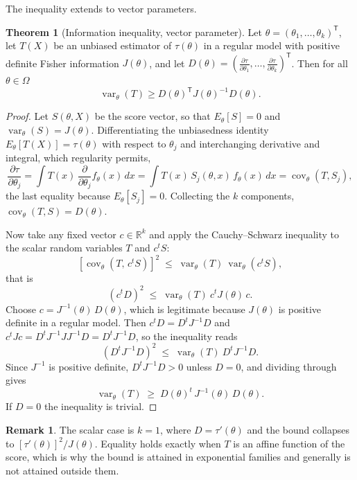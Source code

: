 \documentclass[12pt,a4paper]{report}
\theoremstyle{definition}
\newtheorem{thm}{Theorem}[section]
\newtheorem*{remark}{Remark}
\DeclareMathOperator{\var}{var}
\DeclareMathOperator{\cov}{cov}
\begin{document}
The inequality extends to vector parameters.

\begin{thm}[Information inequality, vector parameter]
\label{thm:crlbvector}
Let $\theta = (\theta_1, \dots, \theta_k)^{\mathsf T}$, let $T(X)$ be an unbiased
estimator of $\tau(\theta)$ in a regular model with positive definite Fisher
information $J(\theta)$, and let
$D(\theta) = \left(\frac{\partial\tau}{\partial\theta_1}, \dots, \frac{\partial\tau}{\partial\theta_k}\right)^{\mathsf T}$.
Then for all $\theta\in\Omega$
\[\var_\theta(T)\ge D(\theta)^{\mathsf T}J(\theta)^{-1}D(\theta) .\]
\end{thm}

\begin{proof}
Let $S(\theta,X)$ be the score vector, so that $E_{\theta}\left[S\right]=0$ and
$\var_{\theta}(S)=J(\theta)$. Differentiating the unbiasedness identity
$E_{\theta}\left[T(X)\right]=\tau(\theta)$ with respect to $\theta_j$ and
interchanging derivative and integral, which regularity permits,
\[\frac{\partial \tau}{\partial\theta_j}
= \int T(x)\,\frac{\partial}{\partial\theta_j} f_{\theta}(x)\,dx
= \int T(x)\, S_j(\theta,x)\, f_{\theta}(x)\,dx
= \cov_{\theta}\!\left(T, S_j\right),\]
the last equality because $E_{\theta}\left[S_j\right]=0$. Collecting the $k$
components, $\cov_{\theta}(T,S) = D(\theta)$.

Now take any fixed vector $c\in\mathbb{R}^{k}$ and apply the Cauchy--Schwarz
inequality to the scalar random variables $T$ and $c^{t}S$:
\[\left[\cov_{\theta}\!\left(T,\, c^{t}S\right)\right]^{2}
\;\leq\; \var_{\theta}(T)\ \var_{\theta}\!\left(c^{t}S\right),\]
that is
\[\left(c^{t}D\right)^{2} \;\leq\; \var_{\theta}(T)\ c^{t}J(\theta)\,c .\]
Choose $c = J^{-1}(\theta)\,D(\theta)$, which is legitimate because $J(\theta)$
is positive definite in a regular model. Then $c^{t}D = D^{t}J^{-1}D$ and
$c^{t}Jc = D^{t}J^{-1}JJ^{-1}D = D^{t}J^{-1}D$, so the inequality reads
\[\left(D^{t}J^{-1}D\right)^{2} \;\leq\; \var_{\theta}(T)\ D^{t}J^{-1}D .\]
Since $J^{-1}$ is positive definite, $D^{t}J^{-1}D>0$ unless $D=0$, and
dividing through gives
\[\var_{\theta}(T) \;\geq\; D(\theta)^{t}\,J^{-1}(\theta)\,D(\theta).\]
If $D=0$ the inequality is trivial.
\end{proof}

\begin{remark}
The scalar case is $k=1$, where $D=\tau'(\theta)$ and the bound collapses to
$\left[\tau'(\theta)\right]^{2}/J(\theta)$. Equality holds exactly when $T$ is
an affine function of the score, which is why the bound is attained in
exponential families and generally is not attained outside them.
\end{remark}
\end{document}
